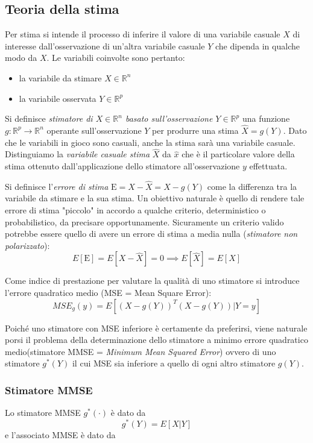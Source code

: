 \subsection{Teoria della stima}
Per stima si intende il processo di inferire il valore di una variabile casuale $X$ di interesse dall'osservazione di un'altra variabile casuale $Y$ che dipenda in qualche modo da $X$. Le variabili coinvolte sono pertanto:
\begin{itemize}
	\item la variabile da stimare $X \in \mathbb{R}^n$
	\item la variabile osservata $Y \in \mathbb{R}^p$
\end{itemize}

Si definisce \textit{stimatore di $X \in \mathbb{R}^n$ basato sull’osservazione $Y \in \mathbb{R}^p$} una funzione $g:\mathbb{R}^p \rightarrow \mathbb{R}^n$ operante sull'osservazione $Y$ per produrre una stima $\widehat{X}=g(Y)$.
Dato che le variabili in gioco sono casuali, anche la stima sarà una variabile casuale. Distinguiamo la \textit{variabile casuale stima} $\widehat{X}$ da $\hat{x}$ che è il particolare valore della stima ottenuto dall'applicazione dello stimatore all'osservazione $y$ effettuata.

Si definisce l'\textit{errore di stima} $\mathrm{E}=X-\widehat{X}=X-g(Y)$ come la differenza tra la variabile da stimare e la sua stima. Un obiettivo naturale è quello di rendere tale errore di stima "piccolo" in accordo
a qualche criterio, deterministico o probabilistico, da precisare opportunamente. Sicuramente un criterio valido potrebbe essere quello di avere un errore di stima a media
nulla (\textit{stimatore non polarizzato}):
\[E[\mathrm{E}]=E[X-\widehat{X}]=0 \implies E[\widehat{X}]=E[X]\]

Come indice di prestazione per valutare la qualità di uno stimatore si introduce l’errore quadratico medio (MSE = Mean Square Error):
\begin{equation}
MSE_g(y)= E[(X-g(Y))^T(X-g(Y))|Y=y]
\end{equation}

Poiché uno stimatore con MSE inferiore è certamente da preferirsi, viene naturale porsi il problema della determinazione dello stimatore a minimo errore quadratico medio(stimatore MMSE = \textit{Minimum Mean Squared Error}) ovvero di uno stimatore $g^*(Y)$ il cui MSE sia inferiore a quello di ogni altro stimatore $g(Y)$.

\subsubsection{Stimatore MMSE}
Lo stimatore MMSE $g^*(\cdot)$ è dato da 
\begin{equation}
\label{stimatoremmse}
g^*(Y)=E[X|Y]
\end{equation}
e l’associato MMSE è dato da

